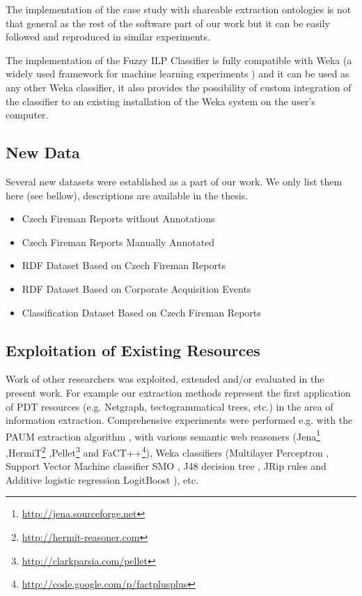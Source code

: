\documentclass[12pt,a4paper,twoside,notitlepage]{article}
\begin{document}
The implementation of the case study with shareable extraction ontologies is not that general as the rest of the software part of our work but it can be easily followed and reproduced in similar experiments.

The implementation of the Fuzzy ILP Classifier is fully compatible with Weka (a widely used framework for machine learning experiments \citep{biblio:Weka}) and it can be used as any other Weka classifier, it also provides the possibility of custom integration of the classifier to an existing installation of the Weka system on the user's computer.

\subsection{New Data}

Several new datasets were established as a part of our work. We only list them here (see bellow), descriptions are available in the thesis.

\begin{itemize}
	\item Czech Fireman Reports without Annotations 
	\item Czech Fireman Reports Manually Annotated 
	\item RDF Dataset Based on Czech Fireman Reports 
	\item RDF Dataset Based on Corporate Acquisition Events 
	\item Classification Dataset Based on Czech Fireman Reports 
\end{itemize}

\subsection{Exploitation of Existing Resources}

Work of other researchers was exploited, extended and/or evaluated in the present work. For example our extraction methods represent the first application of PDT resources (e.g. Netgraph, tectogrammatical trees, etc.) in the area of information extraction. Comprehensive experiments were performed e.g. with the PAUM extraction algorithm \citep{Li:Paum}, with various semantic web reasoners (Jena\footnote{\url{http://jena.sourceforge.net}}
,HermiT\footnote{\url{http://hermit-reasoner.com}}
,Pellet\footnote{\url{http://clarkparsia.com/pellet}}
and FaCT++\footnote{\url{http://code.google.com/p/factplusplus}}), Weka classifiers (Multilayer Perceptron \citep{biblio:bishop-1995},
Support Vector Machine classifier SMO \citep{biblio:SMO},
J48 decision tree \citep{biblio:J48},
JRip rules \citep{weka:JRip} and
Additive logistic regression LogitBoost \citep{biblio:LogitBoost}), etc.
\end{document}
